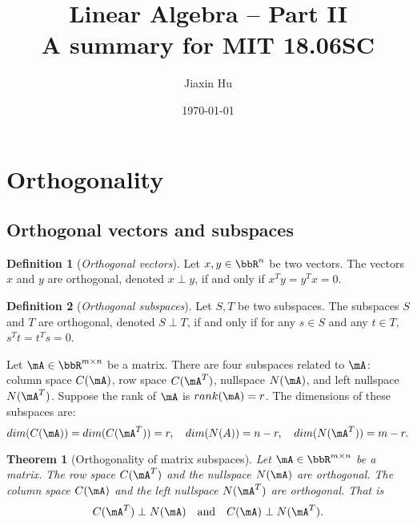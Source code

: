 \documentclass[11pt]{article}
\title{\textbf{Linear Algebra -- Part II}\\A summary for MIT 18.06SC}
\date{\today}
\author{%
Jiaxin Hu
}
\theoremstyle{plain}
\newtheorem{thm}{Theorem}[section]
\theoremstyle{definition}
\newtheorem{defn}{Definition}
\begin{document}

\maketitle


\section{Orthogonality}

\subsection{Orthogonal vectors and subspaces}
\begin{defn}[\textit{Orthogonal vectors}]\label{def:vortho}
	Let  $x,y \in \bbR^{n}$ be two vectors. The vectors $x$ and $y$ are orthogonal,  denoted $x \perp y$, if and only if $x^T y = y^T x = 0$.
\end{defn}

\begin{defn}[\textit{Orthogonal subspaces}]\label{def:sortho}
	Let  $S,T$ be two subspaces. The subspaces $S$ and $T$ are orthogonal,  denoted $S \perp T$, if and only if for any $s \in S$ and any $ t \in T$, $s^T t = t^T s = 0$.
\end{defn}

Let $\mA \in \bbR^{m \times n}$ be a matrix. There are four subspaces related to $\mA\colon$ column space $C(\mA)$, row space $C(\mA^T)$, nullspace $N(\mA)$, and left nullspace $N(\mA^T)$. Suppose the rank of $\mA$ is $rank(\mA) = r$. The dimensions of these subspaces are: 
\[ dim(C(\mA)) = dim(C(\mA^T)) = r,\quad  dim(N(A)) = n-r,\quad dim(N(\mA^T)) = m-r. \] 

\begin{thm}[Orthogonality of matrix subspaces]\label{thm:ortho}
	Let  $\mA \in \bbR^{m \times n}$ be a matrix. The row space $C(\mA^T)$ and the nullspace $N(\mA)$ are orthogonal. The column space $C(\mA)$ and the left nullspace $N(\mA^T)$ are orthogonal. That is
	\[ C(\mA^T) \perp N(\mA)\quad  \text{and} \quad C(\mA) \perp N(\mA^T).  \]
\end{thm}
\end{document}
